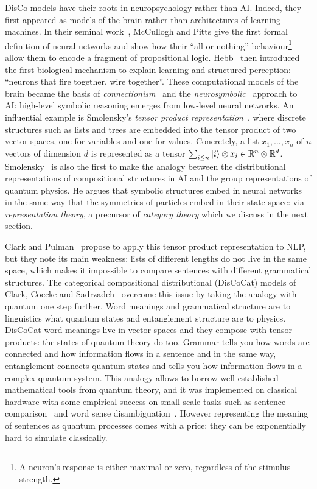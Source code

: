 DisCo models have their roots in neuropsychology rather than AI.
Indeed, they first appeared as models of the brain rather than architectures of learning machines.
In their seminal work~\cite{McCullochPitts43}, McCullogh and Pitts give the first formal definition of neural networks and show how their ``all-or-nothing'' behaviour\footnote
{A neuron's response is either maximal or zero, regardless of the stimulus strength.}
allow them to encode a fragment of propositional logic.
Hebb~\cite{Hebb49} then introduced the first biological mechanism to explain learning and structured perception: ``neurons that fire together, wire together''.
These computational models of the brain became the basis of \emph{connectionism}~\cite{Smolensky87,Smolensky88} and the \emph{neurosymbolic}~\cite{Hilario97} approach to AI: high-level symbolic reasoning emerges from low-level neural networks.
An influential example is Smolensky's \emph{tensor product representation}~\cite{Smolensky90}, where discrete structures such as lists and trees are embedded into the tensor product of two vector spaces, one for variables and one for values.
Concretely, a list $x_1, \dots, x_n$ of $n$ vectors of dimension $d$ is represented as a tensor $\sum_{i \leq n} |i\rangle \otimes x_i \in \mathbb{R}^n \otimes \mathbb{R}^d$.
Smolensky~\cite{Smolensky90} is also the first to make the analogy between the distributional representations of compositional structures in AI and the group representations of quantum physics.
He argues that symbolic structures embed in neural networks in the same way that the symmetries of particles embed in their state space: via \emph{representation theory}, a precursor of \emph{category theory} which we discuss in the next section.

Clark and Pulman~\cite{ClarkPulman07} propose to apply this tensor product representation to NLP, but they note its main weakness: lists of different lengths do not live in the same space, which makes it impossible to compare sentences with different grammatical structures.
The categorical compositional distributional (DisCoCat) models of Clark, Coecke and Sadrzadeh~\cite{ClarkEtAl08,ClarkEtAl10} overcome this issue by taking the analogy with quantum one step further.
Word meanings and grammatical structure are to linguistics what quantum states and entanglement structure are to physics.
DisCoCat word meanings live in vector spaces and they compose with tensor products: the states of quantum theory do too.
Grammar tells you how words are connected and how information flows in a sentence and in the same way, entanglement connects quantum states and tells you how information flows in a complex quantum system.
This analogy allows to borrow well-established mathematical tools from quantum theory, and it was implemented on classical hardware with some empirical success on small-scale tasks such as sentence comparison~\cite{GrefenstetteEtAl10} and word sense disambiguation~\cite{GrefenstetteSadrzadeh11,KartsaklisEtAl13}.
However representing the meaning of sentences as quantum processes comes with a price: they can be exponentially hard to simulate classically.


